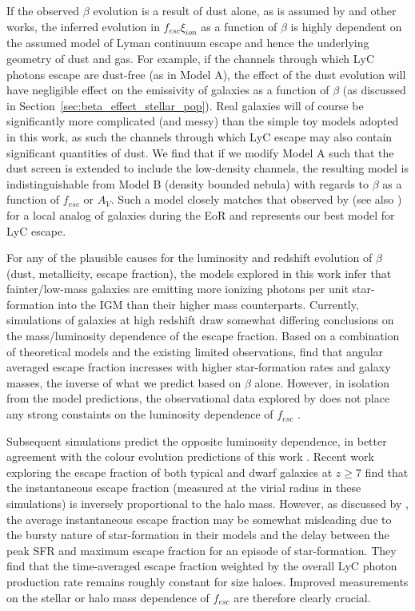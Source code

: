 If the observed $\beta$ evolution is a result of dust alone, as is assumed by \citet{2012ApJ...754...83B} and other works, the inferred evolution in $f_{esc}\xi_{ion}$ as a function of $\beta$ is highly dependent on the assumed model of Lyman continuum escape and hence the underlying geometry of dust and gas. For example, if the channels through which LyC photons escape are dust-free (as in Model A),  the effect of the dust evolution will have negligible effect on the emissivity of galaxies as a function of $\beta$ (as discussed in Section~\ref{sec:beta_effect_stellar_pop}). Real galaxies will of course be significantly more complicated (and messy) than the simple toy models adopted in this work, as such the channels through which LyC escape may also contain significant quantities of dust.  We find that if we modify Model A such that the dust screen is extended to include the low-density channels, the resulting model is indistinguishable from Model B (density bounded nebula) with regards to $\beta$ as a function of $f_{esc}$ or $A_{V}$. Such a model closely matches that observed by \citet{Borthakur:2014bz} (see also \citep{Heckman:2011ju}) for a local analog of galaxies during the EoR and represents our best model for LyC escape. 

For any of the plausible causes for the luminosity and redshift evolution of $\beta$ (dust, metallicity, escape fraction), the models explored in this work infer that fainter/low-mass galaxies are emitting more ionizing photons per unit star-formation into the IGM than their higher mass counterparts. Currently, simulations of galaxies at high redshift draw somewhat differing conclusions on the mass/luminosity dependence of the escape fraction. Based on a combination of theoretical models and the existing limited observations, \citet{Gnedin:2008ib} find that angular averaged escape fraction increases with higher star-formation rates and galaxy masses, the inverse of what we predict based on $\beta$ alone. However, in isolation from the model predictions, the observational data explored by \citet{Gnedin:2008ib} does not place any strong constaints on the luminosity dependence of $f_{esc}$ \citep{Giallongo:2002hi,FernandezSoto:2003ev,Shapley:2006cq}.

Subsequent simulations predict the opposite luminosity dependence, in better agreement with the colour evolution predictions of this work \citep{Razoumov:2010bh,Yajima:2010fb}. Recent work exploring the escape fraction of both typical \citep{Kimm:2014gv} and dwarf \citep{Wise:2014kt} galaxies at $z\geq7$ find that the instantaneous escape fraction (measured at the virial radius in these simulations) is inversely proportional to the halo mass. However, as discussed by \citet{Kimm:2014gv}, the average instantaneous escape fraction may be somewhat misleading due to the bursty nature of star-formation in their models and the delay between the peak SFR and maximum escape fraction for an episode of star-formation. They find that the time-averaged escape fraction weighted by the overall LyC photon production rate remains roughly constant for size haloes. Improved measurements on the stellar or halo mass dependence of $f_{esc}$ are therefore clearly crucial.

